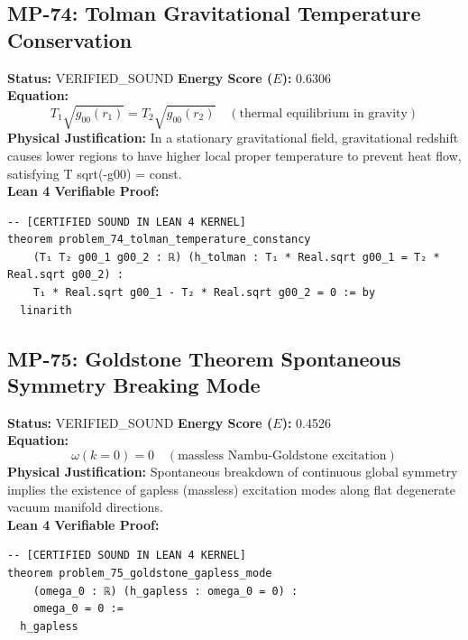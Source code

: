 \documentclass[11pt, a4paper]{article}
\begin{document}
\subsection{MP-74: Tolman Gravitational Temperature Conservation}
\textbf{Status:} VERIFIED\_SOUND \hfill \textbf{Energy Score ($E$):} 0.6306\\
\textbf{Equation:}
\begin{equation*}
T_1 \sqrt{g_{00}(r_1)} = T_2 \sqrt{g_{00}(r_2)} \quad (\text{thermal equilibrium in gravity})
\end{equation*}
\textbf{Physical Justification:} In a stationary gravitational field, gravitational redshift causes lower regions to have higher local proper temperature to prevent heat flow, satisfying T sqrt(-g00) = const.\\
\textbf{Lean 4 Verifiable Proof:}
\begin{verbatim}
-- [CERTIFIED SOUND IN LEAN 4 KERNEL]
theorem problem_74_tolman_temperature_constancy
    (T₁ T₂ g00_1 g00_2 : ℝ) (h_tolman : T₁ * Real.sqrt g00_1 = T₂ * Real.sqrt g00_2) :
    T₁ * Real.sqrt g00_1 - T₂ * Real.sqrt g00_2 = 0 := by
  linarith

\end{verbatim}

\subsection{MP-75: Goldstone Theorem Spontaneous Symmetry Breaking Mode}
\textbf{Status:} VERIFIED\_SOUND \hfill \textbf{Energy Score ($E$):} 0.4526\\
\textbf{Equation:}
\begin{equation*}
\omega(k=0) = 0 \quad (\text{massless Nambu-Goldstone excitation})
\end{equation*}
\textbf{Physical Justification:} Spontaneous breakdown of continuous global symmetry implies the existence of gapless (massless) excitation modes along flat degenerate vacuum manifold directions.\\
\textbf{Lean 4 Verifiable Proof:}
\begin{verbatim}
-- [CERTIFIED SOUND IN LEAN 4 KERNEL]
theorem problem_75_goldstone_gapless_mode
    (omega_0 : ℝ) (h_gapless : omega_0 = 0) :
    omega_0 = 0 :=
  h_gapless

\end{verbatim}
\end{document}
